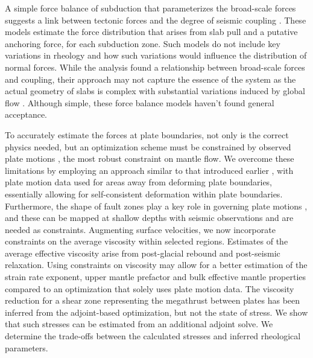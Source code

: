 \documentclass[12pt]{article}
\begin{document}
A simple force balance of subduction that parameterizes the broad-scale forces suggests a link between tectonic forces and the degree of seismic coupling \citep{scholz1995mechanism, scholz2012seismic}. 
These models estimate the force distribution that arises from slab pull and a putative anchoring force, for each subduction zone. Such models do not include key variations in rheology and how such variations would influence the distribution of  normal forces.  While the analysis found a relationship between broad-scale forces and coupling, their approach may not capture the essence of the system as the actual geometry of slabs is complex with substantial variations induced by global flow \citep{scholz2012seismic}. 
Although simple, these force balance models haven't found general acceptance.


  To accurately estimate the forces at plate boundaries, not only is the correct physics needed, but an optimization scheme must be constrained by observed plate motions \citep{BursteddeStadlerAlisicEtAl13,Stadler27082010}, the most robust constraint on mantle flow. We overcome these limitations by employing an approach  similar to that introduced earlier \citep{ratnaswamy2015adjoint}, with plate motion data used for areas away from deforming plate boundaries, essentially allowing for self-consistent deformation within plate boundaries. 
Furthermore, the shape of fault zones play a key role in governing plate motions \citep{Zhong10021995}, and these can be mapped at shallow depths with seismic observations and are needed as constraints.
Augmenting surface velocities, we now incorporate constraints on the average viscosity within selected regions. Estimates of the average effective viscosity arise from post-glacial rebound and post-seismic relaxation. Using constraints on viscosity may allow for a better estimation of the strain rate exponent, upper mantle prefactor and bulk effective mantle properties compared to an optimization that solely uses plate motion data. 
The viscosity reduction for a shear zone representing the megathrust between plates has been inferred from the adjoint-based optimization, but not the state of stress. We show that such stresses can be estimated from an additional adjoint solve.
We determine the trade-offs between the calculated stresses and inferred rheological parameters. 
\end{document}
